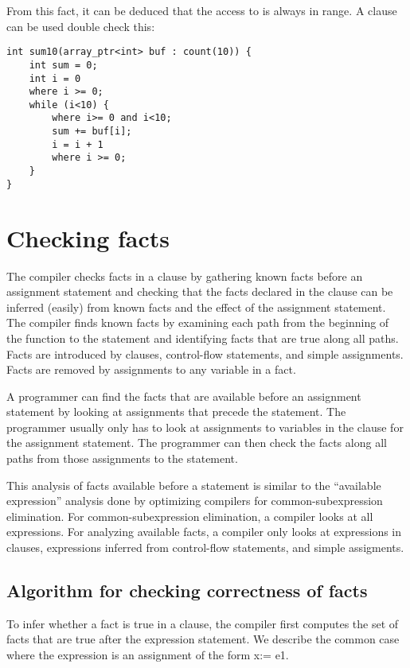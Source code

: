 From this fact, it can be deduced that the access to  is always in
range. A  clause can be used double check this:

\begin{lstlisting}
int sum10(array_ptr<int> buf : count(10)) {
    int sum = 0;
    int i = 0
    where i >= 0;
    while (i<10) {
        where i>= 0 and i<10;
        sum += buf[i];
        i = i + 1
        where i >= 0;
    }
}
\end{lstlisting}

\section{Checking facts}

The compiler checks facts in a  clause by gathering known
facts before an assignment statement and checking that the facts
declared in the  clause can be inferred (easily) from
known facts and the effect of the assignment statement. The compiler
finds known facts by examining each path from the beginning of the
function to the statement and identifying facts that are true along all
paths. Facts are introduced by  clauses, control-flow
statements, and simple assignments. Facts are removed by assignments to any
variable in a fact.

A programmer can find the facts that are available before an assignment
statement by looking at assignments that precede the statement. The
programmer usually only has to look at assignments to variables in the
 clause for the assignment statement. The programmer can then check
the facts along all paths from those assignments to the statement.

This analysis of facts available before a statement is similar to the
``available expression'' analysis done by optimizing compilers for
common-subexpression elimination. For common-subexpression elimination,
a compiler looks at all expressions. For analyzing available facts, a
compiler only looks at expressions in  clauses, expressions
inferred from control-flow statements, and simple assigments.

\subsection{Algorithm for checking correctness of facts}

To infer whether a fact is true in a  clause, the compiler first
computes the set of facts that are true after the expression statement.
We describe the common case where the expression is an assignment of the
form x:= e1.

